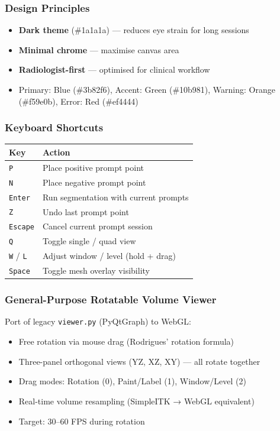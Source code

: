 \documentclass[
  11pt,
]{article}
\providecommand{\tightlist}{%
  \setlength{\itemsep}{0pt}\setlength{\parskip}{0pt}}
\begin{document}
\subsubsection{Design Principles}\label{design-principles}

\begin{itemize}
\tightlist
\item
  \textbf{Dark theme} (\#1a1a1a) --- reduces eye strain for long
  sessions
\item
  \textbf{Minimal chrome} --- maximise canvas area
\item
  \textbf{Radiologist-first} --- optimised for clinical workflow
\item
  Primary: Blue (\#3b82f6), Accent: Green (\#10b981), Warning: Orange
  (\#f59e0b), Error: Red (\#ef4444)
\end{itemize}

\subsubsection{Keyboard Shortcuts}\label{keyboard-shortcuts}

\begin{longtable}[]{@{}ll@{}}
\toprule\noalign{}
Key & Action \\
\midrule\noalign{}
\endhead
\bottomrule\noalign{}
\endlastfoot
\texttt{P} & Place positive prompt point \\
\texttt{N} & Place negative prompt point \\
\texttt{Enter} & Run segmentation with current prompts \\
\texttt{Z} & Undo last prompt point \\
\texttt{Escape} & Cancel current prompt session \\
\texttt{Q} & Toggle single / quad view \\
\texttt{W} / \texttt{L} & Adjust window / level (hold + drag) \\
\texttt{Space} & Toggle mesh overlay visibility \\
\end{longtable}

\subsubsection{General-Purpose Rotatable Volume
Viewer}\label{general-purpose-rotatable-volume-viewer}

Port of legacy \texttt{viewer.py} (PyQtGraph) to WebGL:

\begin{itemize}
\tightlist
\item
  Free rotation via mouse drag (Rodrigues' rotation formula)
\item
  Three-panel orthogonal views (YZ, XZ, XY) --- all rotate together
\item
  Drag modes: Rotation (0), Paint/Label (1), Window/Level (2)
\item
  Real-time volume resampling (SimpleITK → WebGL equivalent)
\item
  Target: 30--60 FPS during rotation
\end{itemize}
\end{document}
